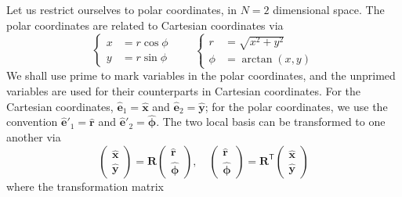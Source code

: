 \documentclass[a4paper, 11pt]{article}
\begin{document}
Let us restrict ourselves to polar coordinates, in $N=2$ dimensional space. The polar coordinates are related to Cartesian coordinates via
\begin{equation}\label{eqn:polar-convert}
    \left\{\begin{aligned}
        x &= r \cos\phi \\ 
        y &= r \sin\phi
    \end{aligned}\right.\qquad 
    \left\{\begin{aligned}
        r &= \sqrt{x^2 + y^2} \\ 
        \phi &= \arctan \left(x, y\right)
    \end{aligned}\right.
\end{equation}
We shall use prime to mark variables in the polar coordinates, and the unprimed variables are used for their counterparts in Cartesian coordinates. For the Cartesian coordinates, $\hat{\mathbf{e}}_1 = \hat{\mathbf{x}}$ and $\hat{\mathbf{e}}_2 = \hat{\mathbf{y}}$; for the polar coordinates, we use the convention $\hat{\mathbf{e}}'_1 = \hat{\bm{r}}$ and $\hat{\mathbf{e}}'_2 = \hat{\bm{\phi}}$. The two local basis can be transformed to one another via
\begin{equation}
    \begin{pmatrix}
        \hat{\mathbf{x}} \\ \hat{\mathbf{y}}
    \end{pmatrix} = \mathbf{R}
    \begin{pmatrix}
        \hat{\bm{r}} \\ \hat{\bm{\phi}}
    \end{pmatrix},\quad 
    \begin{pmatrix}
        \hat{\bm{r}} \\ \hat{\bm{\phi}}
    \end{pmatrix} = \mathbf{R}^{\mathsf{T}}
    \begin{pmatrix}
        \hat{\mathbf{x}} \\ \hat{\mathbf{y}}
    \end{pmatrix}
\end{equation}
where the transformation matrix
\end{document}
